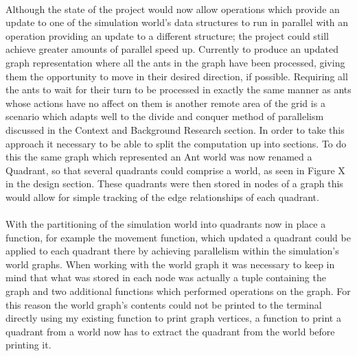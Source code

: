 \documentclass[main.tex]{subfiles}
\begin{document}
\paragraph{}Although the state of the project would now allow operations which provide an update to one of the simulation world's data structures to run in parallel with an operation providing an update to a different structure; the project could still achieve greater amounts of parallel speed up. Currently to produce an updated graph representation where all the ants in the graph have been processed, giving them the opportunity to move in their desired direction, if possible. Requiring all the ants to wait for their turn to be processed in exactly the same manner as ants whose actions have no affect on them is another remote area of the grid is a scenario which adapts well to the divide and conquer method of parallelism discussed in the Context and Background Research section. In order to take this approach it necessary to be able to split the computation up into sections. To do this the same graph which represented an Ant world was now renamed a Quadrant, so that several quadrants could comprise a world, as seen in Figure X in the design section. These quadrants were then stored in nodes of a graph this would allow for simple tracking of the edge relationships of each quadrant.

\paragraph{}With the partitioning of the simulation world into quadrants now in place a function, for example the movement function, which updated a quadrant could be applied to each quadrant there by achieving parallelism within the simulation's world graphs. When working with the world graph it was necessary to keep in mind that what was stored in each node was actually a tuple containing the graph and two additional functions which performed operations on the graph. For this reason the world graph's contents could not be printed to the terminal directly using my existing function to print graph vertices, a function to print a quadrant from a world now has to extract the quadrant from the world before printing it.

\end{document}
